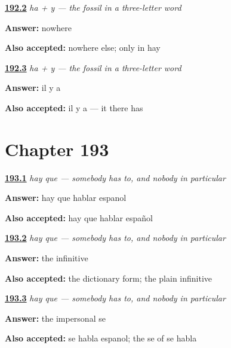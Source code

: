 \noindent\begin{minipage}[t]{\linewidth}
\raggedright
\hyperlink{review-ES-C54-ha-mas-y-fossil}{\textbf{192.2}} \emph{ha + y — the fossil in a three-letter word}\par
\small \textbf{Answer:} nowhere\par
\footnotesize \textbf{Also accepted:} nowhere else; only in hay
\end{minipage}\par\medskip

\noindent\begin{minipage}[t]{\linewidth}
\raggedright
\hyperlink{review-ES-C54-ha-mas-y-french}{\textbf{192.3}} \emph{ha + y — the fossil in a three-letter word}\par
\small \textbf{Answer:} il y a\par
\footnotesize \textbf{Also accepted:} il y a — it there has
\end{minipage}\par\medskip

\section*{Chapter 193}

\noindent\begin{minipage}[t]{\linewidth}
\raggedright
\hyperlink{review-ES-C54-hay-que-say}{\textbf{193.1}} \emph{hay que — somebody has to, and nobody in particular}\par
\small \textbf{Answer:} hay que hablar espanol\par
\footnotesize \textbf{Also accepted:} hay que hablar español
\end{minipage}\par\medskip

\noindent\begin{minipage}[t]{\linewidth}
\raggedright
\hyperlink{review-ES-C54-hay-que-form}{\textbf{193.2}} \emph{hay que — somebody has to, and nobody in particular}\par
\small \textbf{Answer:} the infinitive\par
\footnotesize \textbf{Also accepted:} the dictionary form; the plain infinitive
\end{minipage}\par\medskip

\noindent\begin{minipage}[t]{\linewidth}
\raggedright
\hyperlink{review-ES-C54-hay-que-pair}{\textbf{193.3}} \emph{hay que — somebody has to, and nobody in particular}\par
\small \textbf{Answer:} the impersonal se\par
\footnotesize \textbf{Also accepted:} se habla espanol; the se of se habla
\end{minipage}\par\medskip

